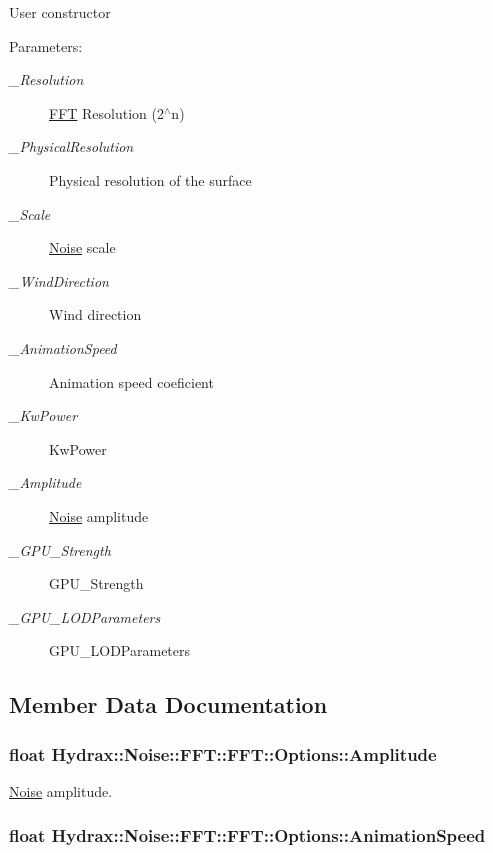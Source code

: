 User constructor \begin{Desc}
\item[Parameters:]
\begin{description}
\item[{\em \_\-Resolution}]\hyperlink{class_hydrax_1_1_noise_1_1_f_f_t}{FFT} Resolution (2$^\wedge$n) \item[{\em \_\-PhysicalResolution}]Physical resolution of the surface \item[{\em \_\-Scale}]\hyperlink{class_hydrax_1_1_noise_1_1_noise}{Noise} scale \item[{\em \_\-WindDirection}]Wind direction \item[{\em \_\-AnimationSpeed}]Animation speed coeficient \item[{\em \_\-KwPower}]KwPower \item[{\em \_\-Amplitude}]\hyperlink{class_hydrax_1_1_noise_1_1_noise}{Noise} amplitude \item[{\em \_\-GPU\_\-Strength}]GPU\_\-Strength \item[{\em \_\-GPU\_\-LODParameters}]GPU\_\-LODParameters \end{description}
\end{Desc}


\subsection{Member Data Documentation}
\hypertarget{struct_hydrax_1_1_noise_1_1_f_f_t_1_1_options_9e12efef04053de76ba32f2fee4e8296}{
\subsubsection[{Amplitude}]{\setlength{\rightskip}{0pt plus 5cm}float Hydrax::Noise::FFT::FFT::Options::Amplitude}}
\label{struct_hydrax_1_1_noise_1_1_f_f_t_1_1_options_9e12efef04053de76ba32f2fee4e8296}


\hyperlink{class_hydrax_1_1_noise_1_1_noise}{Noise} amplitude. 

\hypertarget{struct_hydrax_1_1_noise_1_1_f_f_t_1_1_options_87a99bc4e880913e1268cdb8b347998c}{
\subsubsection[{AnimationSpeed}]{\setlength{\rightskip}{0pt plus 5cm}float Hydrax::Noise::FFT::FFT::Options::AnimationSpeed}}
\label{struct_hydrax_1_1_noise_1_1_f_f_t_1_1_options_87a99bc4e880913e1268cdb8b347998c}


